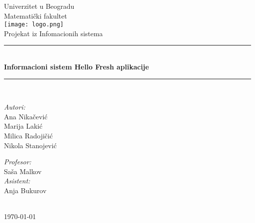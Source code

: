 \begin{titlepage}


\newcommand{\HRule}{\rule{\linewidth}{0.5mm}}
\center
\textup{\Large Univerzitet u Beogradu\\Matemati\v cki fakultet}\\[1.5cm]
\texttt{[image: logo.png]}\\[1cm]
\textup{\Large Projekat iz Infomacionih sistema}\\[0.4cm]

\HRule \\[0.4cm]
{ \huge \bfseries Informacioni sistem Hello Fresh aplikacije}\\[0.4cm]
\HRule \\[4.5cm]

\begin{minipage}{0.4\textwidth}
\begin{flushleft}
\large
\emph{Autori:}\\
\textup Ana Nikačević\\
\textup Marija Lakić\\
\textup Milica Radojičić\\
\textup Nikola Stanojević\\

\end{flushleft}
\end{minipage}
\hfill
\begin{minipage}{0.4\textwidth}
\begin{flushright}
\large
\emph{Profesor:} \\
\textup Saša Malkov\\
\emph{Asistent:} \\
\textup Anja Bukurov\\
\end{flushright}
\end{minipage}\\[2cm]


{\textup \large \today}\\[1cm]

\end{titlepage}
